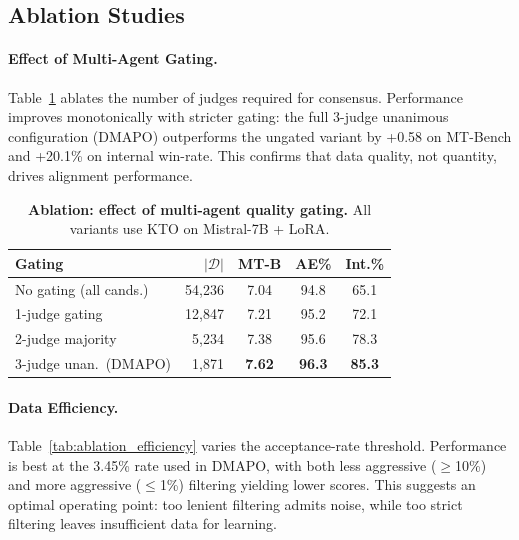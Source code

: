 \documentclass[10pt,twocolumn]{article}
\newcommand{\ours}{\textsc{DMAPO}}
\newcommand{\best}[1]{\textbf{#1}}
\begin{document}
\subsection{Ablation Studies}
\label{sec:ablations}

\paragraph{Effect of Multi-Agent Gating.}
Table~\ref{tab:ablation_gating} ablates the number of judges required for consensus.
Performance improves monotonically with stricter gating: the full 3-judge unanimous configuration (\ours{}) outperforms the ungated variant by +0.58 on MT-Bench and +20.1\% on internal win-rate.
This confirms that data quality, not quantity, drives alignment performance.

\begin{table}[t]
\centering
\caption{\textbf{Ablation: effect of multi-agent quality gating.}
All variants use KTO on Mistral-7B + LoRA.}
\label{tab:ablation_gating}
\vspace{0.5em}
\begin{tabular}{l r ccc}
\toprule
\textbf{Gating} & $|\mathcal{D}|$ & \textbf{MT-B} & \textbf{AE\%} & \textbf{Int.\%} \\
\midrule
No gating (all cands.)    & 54{,}236 & 7.04 & 94.8 & 65.1 \\
1-judge gating            & 12{,}847 & 7.21 & 95.2 & 72.1 \\
2-judge majority          &  5{,}234 & 7.38 & 95.6 & 78.3 \\
3-judge unan.\ (\ours{})  &  1{,}871 & \best{7.62} & \best{96.3} & \best{85.3} \\
\bottomrule
\end{tabular}
\end{table}



\paragraph{Data Efficiency.}
Table~\ref{tab:ablation_efficiency} varies the acceptance-rate threshold.
Performance is best at the 3.45\% rate used in \ours{}, with both less aggressive ($\geq$10\%) and more aggressive ($\leq$1\%) filtering yielding lower scores.
This suggests an optimal operating point: too lenient filtering admits noise, while too strict filtering leaves insufficient data for learning.
\end{document}
